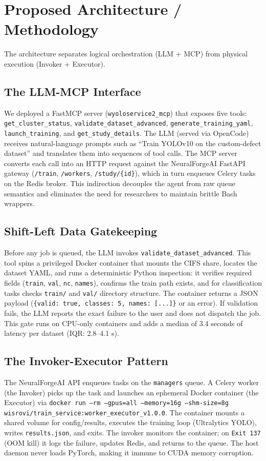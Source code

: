 \documentclass[10pt,twocolumn,letterpaper]{article}
\begin{document}
\section{Proposed Architecture / Methodology}
The architecture separates logical orchestration (LLM + MCP) from physical execution (Invoker + Executor).

\subsection{The LLM-MCP Interface}
We deployed a FastMCP server (\texttt{wyoloservice2\_mcp}) that exposes five tools: \texttt{get\_cluster\_status}, \texttt{validate\_dataset\_advanced}, \texttt{generate\_training\_yaml}, \texttt{launch\_training}, and \texttt{get\_study\_details}. The LLM (served via OpenCode) receives natural-language prompts such as ``Train YOLOv10 on the custom-defect dataset'' and translates them into sequences of tool calls. The MCP server converts each call into an HTTP request against the NeuralForgeAI FastAPI gateway (\texttt{/train}, \texttt{/workers}, \texttt{/study/\{id\}}), which in turn enqueues Celery tasks on the Redis broker. This indirection decouples the agent from raw queue semantics and eliminates the need for researchers to maintain brittle Bash wrappers.

\subsection{Shift-Left Data Gatekeeping}
Before any job is queued, the LLM invokes \texttt{validate\_dataset\_advanced}. This tool spins a privileged Docker container that mounts the CIFS share, locates the dataset YAML, and runs a deterministic Python inspection: it verifies required fields (\texttt{train}, \texttt{val}, \texttt{nc}, \texttt{names}), confirms the train path exists, and for classification tasks checks \texttt{train/} and \texttt{val/} directory structure. The container returns a JSON payload (\texttt{\{valid: true, classes: 5, names: [...]\}} or an error). If validation fails, the LLM reports the exact failure to the user and does not dispatch the job. This gate runs on CPU-only containers and adds a median of 3.4 seconds of latency per dataset (IQR: 2.8--4.1 s).

\subsection{The Invoker-Executor Pattern}
The NeuralForgeAI API enqueues tasks on the \texttt{managers} queue. A Celery worker (the Invoker) picks up the task and launches an ephemeral Docker container (the Executor) via \texttt{docker run --rm --gpus=all --memory=16g --shm-size=8g wisrovi/train\_service:worker\_executor\_v1.0.0}. The container mounts a shared volume for config/results, executes the training loop (Ultralytics YOLO), writes \texttt{results.json}, and exits. The invoker monitors the container; on \texttt{Exit 137} (OOM kill) it logs the failure, updates Redis, and returns to the queue. The host daemon never loads PyTorch, making it immune to CUDA memory corruption.
\end{document}
